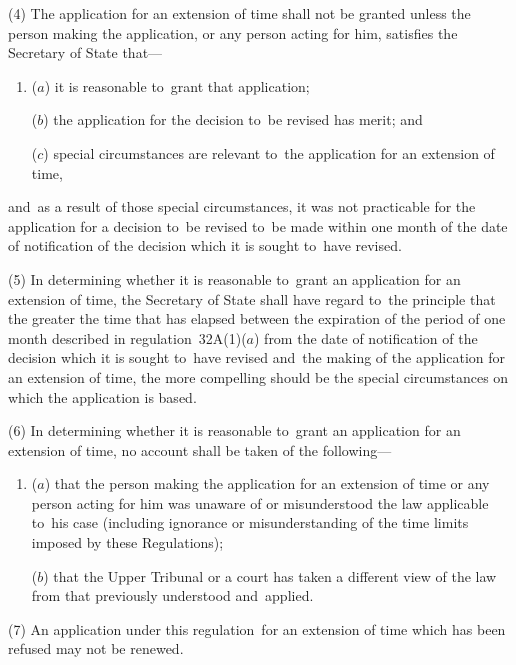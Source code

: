 \documentclass[12pt,a4paper]{article}
\begin{document}
(4) The application for an extension of time shall not be granted unless the person making the application, or any person acting for him, satisfies the Secretary of State that---
\begin{enumerate}\item[]
($a$) it is reasonable to~grant that application;

($b$) the application for the decision to~be revised has merit; and

($c$) special circumstances are relevant to~the application for an extension of time,
\end{enumerate}
and~as a result of those special circumstances, it was not practicable for the application for a decision to~be revised to~be made within one month of the date of notification of the decision which it is sought to~have revised.

(5) In determining whether it is reasonable to~grant an application for an extension of time, the Secretary of State shall have regard to~the principle that the greater the time that has elapsed between the expiration of the period of one month described in regulation~32A(1)($a$) from the date of notification of the decision which it is sought to~have revised and~the making of the application for an extension of time, the more compelling should be the special circumstances on which the application is based.

(6) In determining whether it is reasonable to~grant an application for an extension of time, no account shall be taken of the following---
\begin{enumerate}\item[]
($a$) that the person making the application for an extension of time or any person acting for him was unaware of or misunderstood the law applicable to~his case (including ignorance or misunderstanding of the time limits imposed by these Regulations);

($b$) that 
the Upper Tribunal  %
or a court has taken a different view of the law from that previously understood and~applied.
\end{enumerate}

(7) An application under this regulation~for an extension of time which has been refused may not be renewed.

\end{document}
